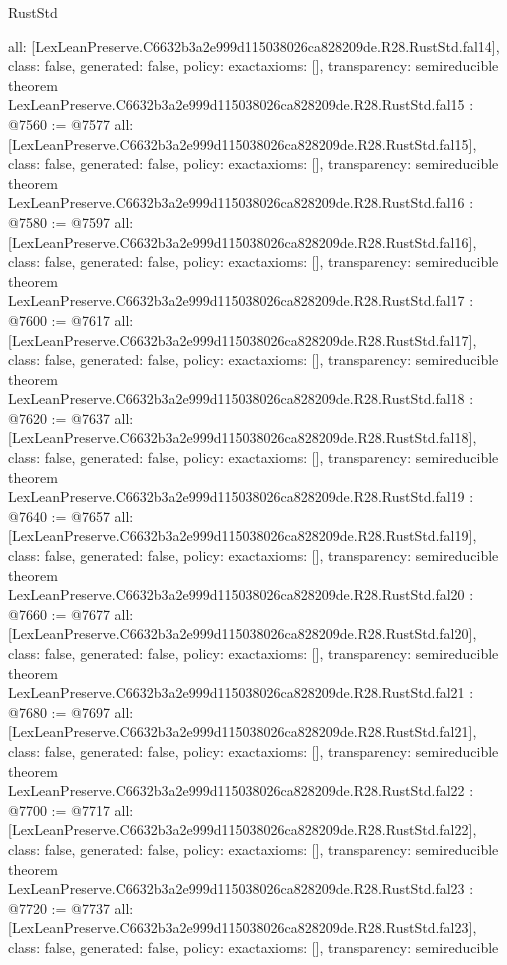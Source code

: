 \begin{lexlean}{RustStd}
\begin{coremodule}
{  all: [LexLeanPreserve.C6632b3a2e999d115038026ca828209de.R28.RustStd.fal14],
  class: false,
  generated: false,
  policy: exact{axioms: []},
  transparency: semireducible
}
theorem LexLeanPreserve.C6632b3a2e999d115038026ca828209de.R28.RustStd.fal15 : @7560 := @7577 {
  all: [LexLeanPreserve.C6632b3a2e999d115038026ca828209de.R28.RustStd.fal15],
  class: false,
  generated: false,
  policy: exact{axioms: []},
  transparency: semireducible
}
theorem LexLeanPreserve.C6632b3a2e999d115038026ca828209de.R28.RustStd.fal16 : @7580 := @7597 {
  all: [LexLeanPreserve.C6632b3a2e999d115038026ca828209de.R28.RustStd.fal16],
  class: false,
  generated: false,
  policy: exact{axioms: []},
  transparency: semireducible
}
theorem LexLeanPreserve.C6632b3a2e999d115038026ca828209de.R28.RustStd.fal17 : @7600 := @7617 {
  all: [LexLeanPreserve.C6632b3a2e999d115038026ca828209de.R28.RustStd.fal17],
  class: false,
  generated: false,
  policy: exact{axioms: []},
  transparency: semireducible
}
theorem LexLeanPreserve.C6632b3a2e999d115038026ca828209de.R28.RustStd.fal18 : @7620 := @7637 {
  all: [LexLeanPreserve.C6632b3a2e999d115038026ca828209de.R28.RustStd.fal18],
  class: false,
  generated: false,
  policy: exact{axioms: []},
  transparency: semireducible
}
theorem LexLeanPreserve.C6632b3a2e999d115038026ca828209de.R28.RustStd.fal19 : @7640 := @7657 {
  all: [LexLeanPreserve.C6632b3a2e999d115038026ca828209de.R28.RustStd.fal19],
  class: false,
  generated: false,
  policy: exact{axioms: []},
  transparency: semireducible
}
theorem LexLeanPreserve.C6632b3a2e999d115038026ca828209de.R28.RustStd.fal20 : @7660 := @7677 {
  all: [LexLeanPreserve.C6632b3a2e999d115038026ca828209de.R28.RustStd.fal20],
  class: false,
  generated: false,
  policy: exact{axioms: []},
  transparency: semireducible
}
theorem LexLeanPreserve.C6632b3a2e999d115038026ca828209de.R28.RustStd.fal21 : @7680 := @7697 {
  all: [LexLeanPreserve.C6632b3a2e999d115038026ca828209de.R28.RustStd.fal21],
  class: false,
  generated: false,
  policy: exact{axioms: []},
  transparency: semireducible
}
theorem LexLeanPreserve.C6632b3a2e999d115038026ca828209de.R28.RustStd.fal22 : @7700 := @7717 {
  all: [LexLeanPreserve.C6632b3a2e999d115038026ca828209de.R28.RustStd.fal22],
  class: false,
  generated: false,
  policy: exact{axioms: []},
  transparency: semireducible
}
theorem LexLeanPreserve.C6632b3a2e999d115038026ca828209de.R28.RustStd.fal23 : @7720 := @7737 {
  all: [LexLeanPreserve.C6632b3a2e999d115038026ca828209de.R28.RustStd.fal23],
  class: false,
  generated: false,
  policy: exact{axioms: []},
  transparency: semireducible
}
\end{coremodule}
\end{lexlean}
